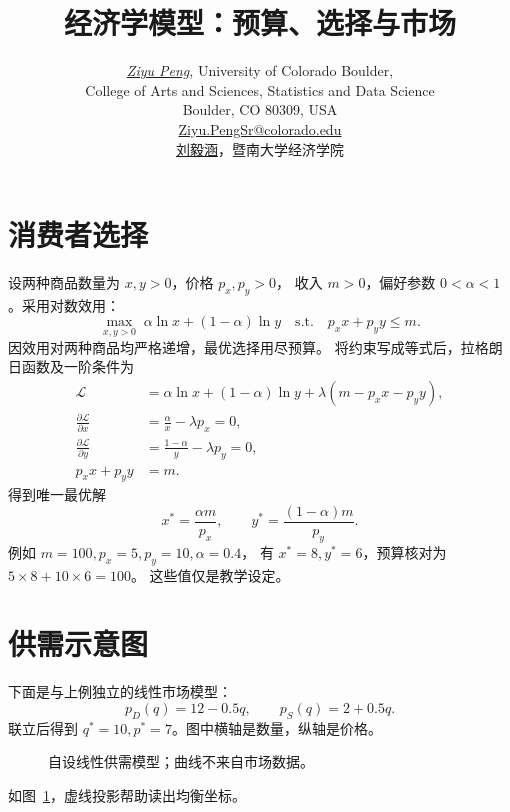 \documentclass[UTF8,a4paper,fontset=fandol]{ctexart}
\title{经济学模型：预算、选择与市场}
\author{\href{https://github.com/pzy54154631-hub}{\textit{Ziyu Peng}}, University of Colorado Boulder,
  \\[0.1em]College of Arts and Sciences, Statistics and Data Science
  \\[0.1em]Boulder, CO 80309, USA
  \\[0.1em]\href{mailto:Ziyu.PengSr@colorado.edu}{Ziyu.PengSr@colorado.edu}
  \\[0.35em]
  \href{https://pzy54154631-hub.github.io/liuyihan/}{刘毅涵}，暨南大学经济学院}
\date{}
\begin{document}
\maketitle
\section{消费者选择}
设两种商品数量为 $x,y>0$，价格 $p_x,p_y>0$，
收入 $m>0$，偏好参数 $0<\alpha<1$。采用对数效用：
\begin{equation}
  \max_{x,y>0}\; \alpha\ln x+(1-\alpha)\ln y
  \quad\text{s.t.}\quad p_xx+p_yy\le m.
  \label{eq:choice}
\end{equation}
因效用对两种商品均严格递增，最优选择用尽预算。
将约束写成等式后，拉格朗日函数及一阶条件为
\begin{align}
 \mathcal L&=\alpha\ln x+(1-\alpha)\ln y
           +\lambda(m-p_xx-p_yy),\\
 \frac{\partial\mathcal L}{\partial x}
   &=\frac{\alpha}{x}-\lambda p_x=0,\\
 \frac{\partial\mathcal L}{\partial y}
   &=\frac{1-\alpha}{y}-\lambda p_y=0,\\
 p_xx+p_yy&=m.
\end{align}
得到唯一最优解
\[
 x^*=\frac{\alpha m}{p_x},\qquad
 y^*=\frac{(1-\alpha)m}{p_y}.
\]
例如 $m=100,p_x=5,p_y=10,\alpha=0.4$，
有 $x^*=8,y^*=6$，预算核对为 $5\times8+10\times6=100$。
这些值仅是教学设定。

\clearpage
\section{供需示意图}
下面是与上例独立的线性市场模型：
\[
 p_D(q)=12-0.5q,\qquad p_S(q)=2+0.5q.
\]
联立后得到 $q^*=10,p^*=7$。图中横轴是数量，纵轴是价格。
\begin{figure}[htbp]
\centering
{}
\caption{自设线性供需模型；曲线不来自市场数据。}
\label{fig:supply-demand}
\end{figure}
如图~\ref{fig:supply-demand}，虚线投影帮助读出均衡坐标。
\end{document}
